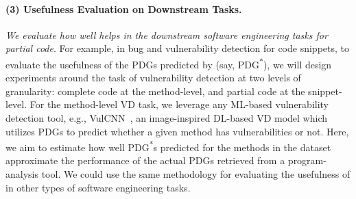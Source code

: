 \paragraph{\bf (3) Usefulness Evaluation on Downstream Tasks.}

{\em We evaluate how well {\tool} helps in the downstream software
  engineering tasks for partial code}. For example, in bug and
vulnerability detection for code snippets, to evaluate the usefulness
of the PDGs predicted by \tool (say, PDG\textsuperscript{*}), we
will design experiments around the task of vulnerability detection at two
levels of granularity: complete code at the method-level, and partial
code at the snippet-level. For the method-level VD task, we leverage
any ML-based vulnerability detection tool, e.g.,
VulCNN~\cite{wu2022vulcnn}, an image-inspired DL-based VD model which
utilizes PDGs to predict whether a given method has vulnerabilities or
not. Here, we aim to estimate how well PDG\textsuperscript{*}s
predicted for the methods in the dataset approximate the performance
of the actual PDGs retrieved from a program-analysis tool. We could
use the same methodology for evaluating the usefulness of {\tool} in
other types of software engineering tasks.




